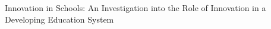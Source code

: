 Innovation in Schools: An Investigation into the Role of Innovation in a Developing Education System